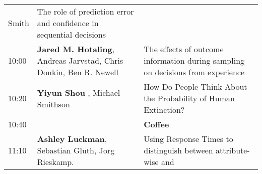 \documentclass[]{article}
\begin{document}
\begin{longtable}[]{@{}lll@{}}
\begin{minipage}[t]{0.38\columnwidth}
Smith\strut
\end{minipage} & \begin{minipage}[t]{0.51\columnwidth}\raggedright\strut
The role of prediction error and confidence in sequential
decisions\strut
\end{minipage}\tabularnewline
\begin{minipage}[t]{0.03\columnwidth}\raggedright\strut
10:00\strut
\end{minipage} & \begin{minipage}[t]{0.38\columnwidth}\raggedright\strut
\textbf{Jared M. Hotaling}, Andreas Jarvstad, Chris Donkin, Ben R.
Newell\strut
\end{minipage} & \begin{minipage}[t]{0.51\columnwidth}\raggedright\strut
The effects of outcome information during sampling on decisions from
experience\strut
\end{minipage}\tabularnewline
\begin{minipage}[t]{0.03\columnwidth}\raggedright\strut
10:20\strut
\end{minipage} & \begin{minipage}[t]{0.38\columnwidth}\raggedright\strut
\textbf{Yiyun Shou} , Michael Smithson\strut
\end{minipage} & \begin{minipage}[t]{0.51\columnwidth}\raggedright\strut
How Do People Think About the Probability of Human Extinction?\strut
\end{minipage}\tabularnewline
\begin{minipage}[t]{0.03\columnwidth}\raggedright\strut
10:40\strut
\end{minipage} & \begin{minipage}[t]{0.38\columnwidth}\raggedright\strut
\strut
\end{minipage} & \begin{minipage}[t]{0.51\columnwidth}\raggedright\strut
\textbf{Coffee}\strut
\end{minipage}\tabularnewline
\begin{minipage}[t]{0.03\columnwidth}\raggedright\strut
11:10\strut
\end{minipage} & \begin{minipage}[t]{0.38\columnwidth}\raggedright\strut
\textbf{Ashley Luckman}, Sebastian Gluth, Jorg Rieskamp.\strut
\end{minipage} & \begin{minipage}[t]{0.51\columnwidth}\raggedright\strut
Using Response Times to distinguish between attribute-wise and

\end{minipage}
\end{longtable}
\end{document}
